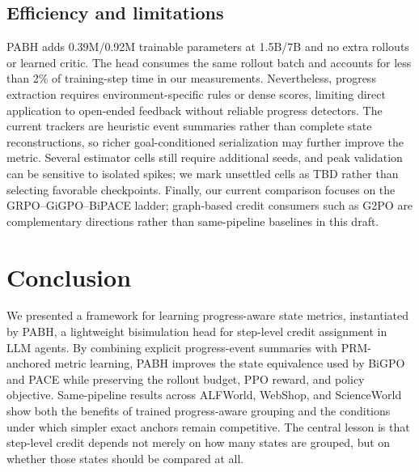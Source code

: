 \documentclass[10pt,twocolumn,letterpaper]{article}
\newcommand{\method}{PABH\xspace}
\newcommand{\TBD}{\textcolor{red!60!black}{TBD}}
\begin{document}
\subsection{Efficiency and limitations}
\method adds 0.39M/0.92M trainable parameters at 1.5B/7B and no extra rollouts or learned critic. The head consumes the same rollout batch and accounts for less than 2\% of training-step time in our measurements. Nevertheless, progress extraction requires environment-specific rules or dense scores, limiting direct application to open-ended feedback without reliable progress detectors. The current trackers are heuristic event summaries rather than complete state reconstructions, so richer goal-conditioned serialization may further improve the metric. Several estimator cells still require additional seeds, and peak validation can be sensitive to isolated spikes; we mark unsettled cells as \TBD{} rather than selecting favorable checkpoints. Finally, our current comparison focuses on the GRPO--GiGPO--BiPACE ladder; graph-based credit consumers such as G2PO are complementary directions rather than same-pipeline baselines in this draft.

\section{Conclusion}
We presented a framework for learning progress-aware state metrics, instantiated by \method, a lightweight bisimulation head for step-level credit assignment in LLM agents. By combining explicit progress-event summaries with PRM-anchored metric learning, \method improves the state equivalence used by BiGPO and PACE while preserving the rollout budget, PPO reward, and policy objective. Same-pipeline results across ALFWorld, WebShop, and ScienceWorld show both the benefits of trained progress-aware grouping and the conditions under which simpler exact anchors remain competitive. The central lesson is that step-level credit depends not merely on how many states are grouped, but on whether those states should be compared at all.

{\small


}

\appendix

\end{document}
